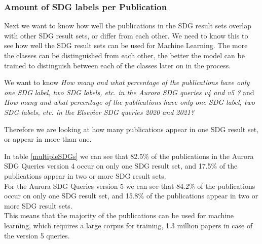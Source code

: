 \documentclass{article}
\begin{document}

\subsubsection{Amount of SDG labels per Publication}
Next we want to know how well the publications in the SDG result sets overlap with other SDG result sets, or differ from each other.  
We need to know this to see how well the SDG result sets can be used for Machine Learning. The more the classes can be distinguished from each other, the better the model can be trained to distinguish between each of the classes later on in the process.

We want to know \emph{How many and what percentage of the publications have only one SDG label, two SDG labels, etc. in the Aurora SDG queries v4 and v5 ? } and \emph{How many and what percentage of the publications have only one SDG label, two SDG labels, etc. in the Elsevier SDG queries 2020 and 2021?}

Therefore we are looking at how many publications appear in one SDG result set, or appear in more than one. 

In table \ref{multipleSDGs} we can see that 82.5\%  of the publications in the Aurora SDG Queries version 4 occur on only one SDG result set, and 17.5\% of the publications appear in two or more SDG result sets.\\
For the Aurora SDG Queries version 5 we can see that 84.2\% of the publications occur on only one SDG result set, and 15.8\% of the publications appear in two or more SDG result sets.\\
This means that the majority of the publications can be used for machine learning, which requires a large corpus for training, 1.3 million papers in case of the version 5 queries.
\end{document}

